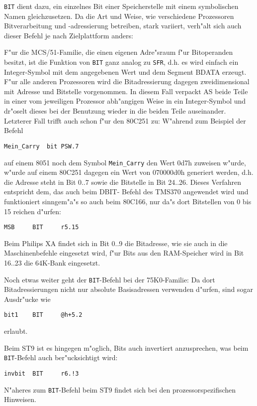 \documentclass[12pt,a4paper,twoside]{report}
\newcommand{\tty}[1]{{\tt #1}}
\begin{document}
\tty{BIT} dient dazu, ein einzelnes Bit einer Speicherstelle mit einem
symbolischen Namen gleichzusetzen.  Da die Art und Weise, wie
verschiedene Prozessoren Bitverarbeitung und -adressierung betreiben,
stark variiert, verh"alt sich auch dieser Befehl je nach Zielplattform
anders:
\par
F"ur die MCS/51-Familie, die einen eigenen Adre"sraum f"ur Bitoperanden
besitzt, ist die Funktion von \tty{BIT} ganz analog zu \tty{SFR}, d.h.
es wird einfach ein Integer-Symbol mit dem angegebenen Wert und dem
Segment BDATA erzeugt.  F"ur alle anderen Prozessoren wird die
Bitadressierung dagegen zweidimensional mit Adresse und Bitstelle
vorgenommen.  In diesem Fall verpackt AS beide Teile in einer vom
jeweiligen Prozessor abh"angigen Weise in ein Integer-Symbol und dr"oselt
dieses bei der Benutzung wieder in die beiden Teile auseinander.
Letzterer Fall trifft auch schon f"ur den 80C251 zu:  W"ahrend zum Beispiel
der Befehl
\begin{verbatim}
Mein_Carry	bit	PSW.7
\end{verbatim}
auf einem 8051 noch dem Symbol \tty{Mein\_Carry} den Wert 0d7h zuweisen
w"urde, w"urde auf einem 80C251 dagegen ein Wert von 070000d0h generiert
werden, d.h. die Adresse steht in Bit  0..7 sowie die Bitstelle in Bit
24..26.  Dieses Verfahren entspricht dem, das auch beim DBIT-
Befehl des TMS370 angewendet wird und funktioniert sinngem"a"s so auch
beim 80C166, nur da"s dort Bitstellen von 0 bis 15 reichen d"urfen:
\begin{verbatim}
MSB     BIT     r5.15
\end{verbatim}
Beim Philips XA findet sich in Bit 0..9 die Bitadresse, wie sie auch
in die Maschinenbefehle eingesetzt wird, f"ur Bits aus den RAM-Speicher
wird in Bit 16..23 die 64K-Bank eingesetzt.
\par
Noch etwas weiter geht der \tty{BIT}-Befehl bei der 75K0-Familie: Da
dort Bitadressierungen nicht nur absolute Basisadressen verwenden
d"urfen, sind sogar Ausdr"ucke wie
\begin{verbatim}
bit1    BIT     @h+5.2
\end{verbatim}
erlaubt.
\par
Beim ST9 ist es hingegen m"oglich, Bits auch invertiert anzusprechen, 
was beim \tty{BIT}-Befehl auch ber"ucksichtigt wird:
\begin{verbatim}
invbit  BIT     r6.!3
\end{verbatim}
N"aheres zum \tty{BIT}-Befehl beim ST9 findet sich bei den
prozessorspezifischen Hinweisen.
\end{document}
